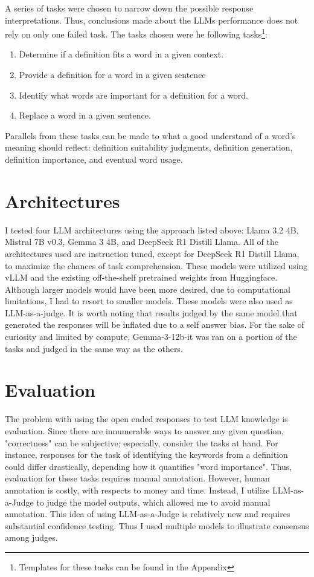 \documentclass{brandeis-thesis3.2}
\theoremstyle{plain}
\theoremstyle{definition}
\theoremstyle{remark}
\numberwithin{equation}{section}
\renewcommand\cite{\citep}
\begin{document}
A series of tasks were chosen to narrow down the possible response interpretations. Thus, conclusions made about the LLMs performance does not rely on only one failed task. The tasks chosen were he following tasks\footnote{Templates for these tasks can be found in the Appendix}:
\begin{enumerate}
    \item Determine if a definition fits a word in a given context.
    \item Provide a definition for a word in a given sentence
    \item Identify what words are important for a definition for a word.
    \item Replace a word in a given sentence. 
\end{enumerate}

Parallels from these tasks can be made to what a good understand of a word's meaning should reflect: definition suitability judgments, definition generation, definition importance, and eventual word usage. 

\section{Architectures}
I tested four LLM architectures using the approach listed above: Llama 3.2 4B, Mistral 7B v0.3, Gemma 3 4B, and DeepSeek R1 Distill Llama. All of the architectures used are instruction tuned, except for DeepSeek R1 Distill Llama, to maximize the chances of task comprehension. These models were utilized using vLLM and the existing off-the-shelf pretrained weights from Huggingface. Although larger models would have been more desired, due to computational limitations, I had to resort to smaller models. These models were also used as LLM-as-a-judge. It is worth noting that results judged by the same model that generated the responses will be inflated due to a self answer bias. For the sake of curiosity and limited by compute, Gemma-3-12b-it was ran on a portion of the tasks and judged in the same way as the others.

\section{Evaluation}
The problem with using the open ended responses to test LLM knowledge is evaluation. Since there are innumerable ways to answer any given question, "correctness" can be subjective; especially, consider the tasks at hand. For instance, responses for the task of identifying the keywords from a definition could differ drastically, depending how it quantifies "word importance". Thus, evaluation for these tasks requires manual annotation. However, human annotation is costly, with respects to money and time. Instead, I utilize LLM-as-a-Judge \cite{zheng_judging_2023} to judge the model outputs, which allowed me to avoid manual annotation. This idea of using LLM-as-a-Judge is relatively new and requires substantial confidence testing. Thus I used multiple models to illustrate consensus among judges.
\end{document}
